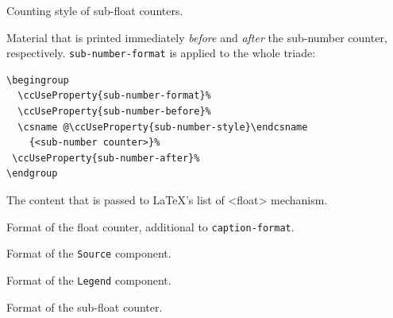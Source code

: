 
Counting style of sub-float counters.


Material that is printed immediately \textit{before} and
\textit{after} the sub-number counter, respectively.
\lstinline{sub-number-format} is applied to the whole triade:
\begin{lstlisting}[style=tex]
\begingroup
  \ccUseProperty{sub-number-format}%
  \ccUseProperty{sub-number-before}%
  \csname @\ccUseProperty{sub-number-style}\endcsname
    {<sub-number counter>}%
 \ccUseProperty{sub-number-after}%
\endgroup
\end{lstlisting}

The content that is passed to \LaTeX's list of <float> mechanism.



Format of the float counter, additional to \lstinline{caption-format}.


Format of the \lstinline{Source} component.


Format of the \lstinline{Legend} component.


Format of the sub-float counter.




